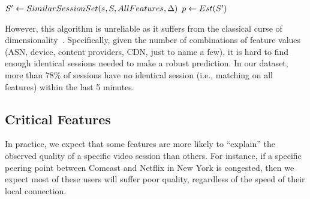 \begin{algorithm}[t!]
\begin{small}
 $S'\leftarrow SimilarSessionSet(s,S,AllFeatures,\Delta)$\;
 $p\leftarrow Est(S')$\;
 \;
\end{small}
 \caption{{\bf {\em Baseline prediction that finds sessions matching on all features and uses their 
 observed quality as the basis for prediction.  %
 }}}
\label{alg:baseline}
\end{algorithm}

 


However, this algorithm is unreliable as it suffers from the 
classical curse of 
dimensionality~\cite{powell2007approximate}. 
Specifically, given the number of combinations 
of feature values (ASN, device, content providers, 
CDN, just to name a few), it is hard to find enough identical 
sessions needed to make a robust prediction. 
In our dataset, more than 78\% of sessions have no 
identical session (i.e., matching on all features)
within the last 5 minutes.


\subsection{Critical Features}
\label{subsec:cfa:outline:critical}

 In practice, we expect that some features are
more likely to  ``explain'' the observed quality 
of a specific video session than others.  
For instance, if a specific peering point
between Comcast and Netflix in New York is 
congested, then we expect most of these users 
will suffer poor quality, regardless of the speed of 
their local connection. 

